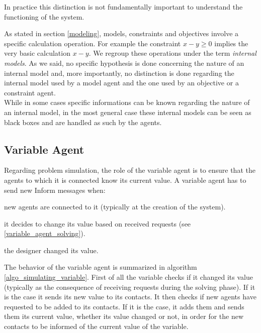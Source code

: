 In practice this distinction is not fundamentally important to understand the functioning of the system.

As stated in section \ref{modeling}, models, constraints and objectives involve a specific calculation operation. For example the constraint $x -y \geq 0$ implies the very basic calculation $x - y$. We regroup these operations under the term \emph{internal models}. As we said, no specific hypothesis is done concerning the nature of an internal model and, more importantly, no distinction is done regarding the internal model used by a model agent and the one used by an objective or a constraint agent.\\
While in some cases specific informations can be known regarding the nature of an internal model, in the most general case these internal models can be seen as black boxes and are handled as such by the agents.

\subsection{Variable Agent}

Regarding problem simulation, the role of the variable agent is to ensure that the agents to which it is connected know its current value.
A variable agent has to send new Inform messages when:
\begin{compactitem}
\item new agents are connected to it (typically at the creation of the system).
\item it decides to change its value based on received requests (see \ref{variable_agent_solving}).
\item the designer changed its value.
\end{compactitem}

The behavior of the variable agent is summarized in algorithm \ref{algo_simulating_variable}. First of all the variable checks if it changed its value (typically as the consequence of receiving requests during the solving phase). If it is the case it sends its new value to its contacts. It then checks if new agents have requested to be added to its contacts. If it is the case, it adds them and sends them its current value, whether its value changed or not, in order for the new contacts to be informed of the current value of the variable.

